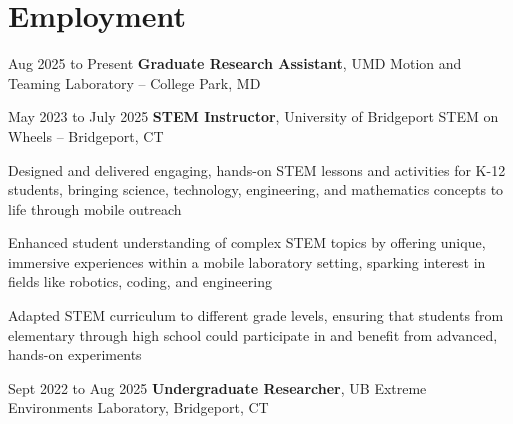 \section{Employment}
    \begin{twocolentry}{
        Aug 2025 to Present
    }
        \textbf{Graduate Research Assistant}, UMD Motion and Teaming Laboratory -- College Park, MD\end{twocolentry}

    \vspace{0.10 cm}
    
    \vspace{0.2 cm}

    \begin{twocolentry}{
        May 2023 to July 2025
    }
        \textbf{STEM Instructor}, University of Bridgeport STEM on Wheels -- Bridgeport, CT\end{twocolentry}

    \vspace{0.10 cm}
    \begin{onecolentry}
        \begin{highlights}
          \item Designed and delivered engaging, hands-on STEM lessons and activities for K-12 students, bringing science, technology, engineering, and mathematics concepts to life through mobile outreach
          \item Enhanced student understanding of complex STEM topics by offering unique, immersive experiences within a mobile laboratory setting, sparking interest in fields like robotics, coding, and engineering
          \item Adapted STEM curriculum to different grade levels, ensuring that students from elementary through high school could participate in and benefit from advanced, hands-on experiments
        \end{highlights}
    \end{onecolentry}  
    
    \vspace{0.2 cm}
    
    \begin{twocolentry}{Sept 2022 to Aug 2025}
        \textbf{Undergraduate Researcher}, UB Extreme Environments Laboratory, Bridgeport, CT\end{twocolentry}

